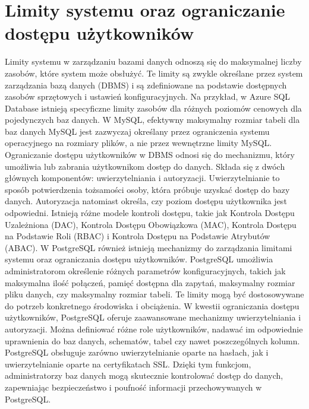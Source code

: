 \documentclass[letterpaper,10pt,polish]{sphinxmanual}
\begin{document}
\chapter{Limity systemu oraz ograniczanie dostępu użytkowników}
\label{\detokenize{rozdzialy/rozdzial6:limity-systemu-oraz-ograniczanie-dostepu-uzytkownikow}}\label{\detokenize{rozdzialy/rozdzial6::doc}}
\sphinxAtStartPar
Limity systemu w zarządzaniu bazami danych odnoszą się do maksymalnej liczby zasobów, które system może obsłużyć. Te limity są zwykle określane przez system zarządzania bazą danych (DBMS) i są zdefiniowane na podstawie dostępnych zasobów sprzętowych i ustawień konfiguracyjnych. Na przykład, w Azure SQL Database istnieją specyficzne limity zasobów dla różnych poziomów cenowych dla pojedynczych baz danych. W MySQL, efektywny maksymalny rozmiar tabeli dla baz danych MySQL jest zazwyczaj określany przez ograniczenia systemu operacyjnego na rozmiary plików, a nie przez wewnętrzne limity MySQL.
Ograniczanie dostępu użytkowników w DBMS odnosi się do mechanizmu, który umożliwia lub zabrania użytkownikom dostęp do danych. Składa się z dwóch głównych komponentów: uwierzytelniania i autoryzacji. Uwierzytelnianie to sposób potwierdzenia tożsamości osoby, która próbuje uzyskać dostęp do bazy danych. Autoryzacja natomiast określa, czy poziom dostępu użytkownika jest odpowiedni. Istnieją różne modele kontroli dostępu, takie jak Kontrola Dostępu Uzależniona (DAC), Kontrola Dostępu Obowiązkowa (MAC), Kontrola Dostępu na Podstawie Roli (RBAC) i Kontrola Dostępu na Podstawie Atrybutów (ABAC).
W PostgreSQL również istnieją mechanizmy do zarządzania limitami systemu oraz ograniczania dostępu użytkowników. PostgreSQL umożliwia administratorom określenie różnych parametrów konfiguracyjnych, takich jak maksymalna ilość połączeń, pamięć dostępna dla zapytań, maksymalny rozmiar pliku danych, czy maksymalny rozmiar tabeli. Te limity mogą być dostosowywane do potrzeb konkretnego środowiska i obciążenia.
W kwestii ograniczania dostępu użytkowników, PostgreSQL oferuje zaawansowane mechanizmy uwierzytelniania i autoryzacji. Można definiować różne role użytkowników, nadawać im odpowiednie uprawnienia do baz danych, schematów, tabel czy nawet poszczególnych kolumn. PostgreSQL obsługuje zarówno uwierzytelnianie oparte na hasłach, jak i uwierzytelnianie oparte na certyfikatach SSL.
Dzięki tym funkcjom, administratorzy baz danych mogą skutecznie kontrolować dostęp do danych, zapewniając bezpieczeństwo i poufność informacji przechowywanych w PostgreSQL.

\sphinxstepscope
\end{document}
